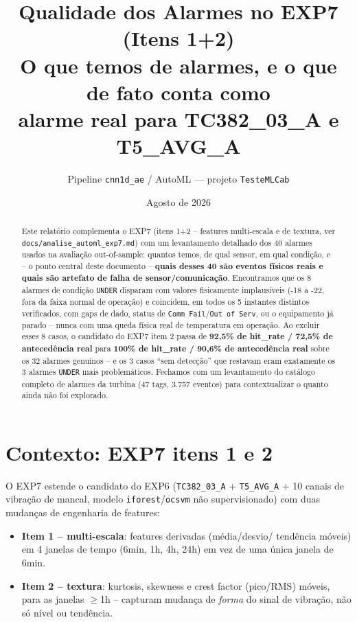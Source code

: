 \documentclass[11pt,a4paper]{article}
\title{Qualidade dos Alarmes no EXP7 (Itens 1+2)\\
\large O que temos de alarmes, e o que de fato conta como\\
alarme real para TC382\_03\_A e T5\_AVG\_A}
\author{Pipeline \texttt{cnn1d\_ae} / AutoML --- projeto \texttt{TesteMLCab}}
\date{Agosto de 2026}
\begin{document}
\maketitle

\begin{abstract}
Este relatório complementa o EXP7 (itens 1+2 -- features multi-escala e de
textura, ver \texttt{docs/analise\_automl\_exp7.md}) com um levantamento
detalhado dos 40 alarmes usados na avaliação out-of-sample: quantos temos,
de qual sensor, em qual condição, e -- o ponto central deste documento --
\textbf{quais desses 40 são eventos físicos reais e quais são artefato de
falha de sensor/comunicação}. Encontramos que os 8 alarmes de condição
\texttt{UNDER} disparam com valores fisicamente implausíveis
(-18 a -22, fora da faixa normal de operação) e coincidem, em todos os 5
instantes distintos verificados, com gaps de dado, status de
\texttt{Comm Fail}/\texttt{Out of Serv}, ou o equipamento já parado --
nunca com uma queda física real de temperatura em operação. Ao excluir
esses 8 casos, o candidato do EXP7 item 2 passa de \textbf{92,5\% de
hit\_rate / 72,5\% de antecedência real} para \textbf{100\% de hit\_rate /
90,6\% de antecedência real} sobre os 32 alarmes genuínos -- e os 3 casos
``sem detecção'' que restavam eram exatamente os 3 alarmes \texttt{UNDER}
mais problemáticos. Fechamos com um levantamento do catálogo completo de
alarmes da turbina (47 tags, 3.757 eventos) para contextualizar o quanto
ainda não foi explorado.
\end{abstract}

\tableofcontents

\section{Contexto: EXP7 itens 1 e 2}

O EXP7 estende o candidato do EXP6 (\texttt{TC382\_03\_A} + \texttt{T5\_AVG\_A}
+ 10 canais de vibração de mancal, modelo \texttt{iforest}/\texttt{ocsvm}
não supervisionado) com duas mudanças de engenharia de features:

\begin{itemize}
  \item \textbf{Item 1 -- multi-escala}: features derivadas (média/desvio/
        tendência móveis) em 4 janelas de tempo (6min, 1h, 4h, 24h) em vez
        de uma única janela de 6min.
  \item \textbf{Item 2 -- textura}: kurtosis, skewness e crest factor
        (pico/RMS) móveis, para as janelas $\geq$1h -- capturam mudança de
        \emph{forma} do sinal de vibração, não só nível ou tendência.
\end{itemize}
\end{document}
